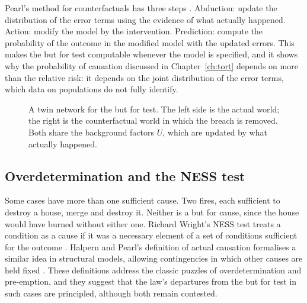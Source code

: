 Pearl's method for counterfactuals has three steps \citep{pearl2009}. Abduction: update the distribution of the error terms using the evidence of what actually happened. Action: modify the model by the intervention. Prediction: compute the probability of the outcome in the modified model with the updated errors. This makes the but for test computable whenever the model is specified, and it shows why the probability of causation discussed in Chapter~\ref{ch:tort} depends on more than the relative risk: it depends on the joint distribution of the error terms, which data on populations do not fully identify.

\begin{figure}[t]
\centering
{}
\caption{A twin network for the but for test. The left side is the actual world; the right is the counterfactual world in which the breach is removed. Both share the background factors $U$, which are updated by what actually happened.}
\label{fig:twin}
\end{figure}

\subsection{Overdetermination and the NESS test}

Some cases have more than one sufficient cause. Two fires, each sufficient to destroy a house, merge and destroy it. Neither is a but for cause, since the house would have burned without either one. Richard Wright's NESS test treats a condition as a cause if it was a necessary element of a set of conditions sufficient for the outcome \citep{wright1985}. Halpern and Pearl's definition of actual causation formalises a similar idea in structural models, allowing contingencies in which other causes are held fixed \citep{halpern2005}. These definitions address the classic puzzles of overdetermination and pre-emption, and they suggest that the law's departures from the but for test in such cases are principled, although both remain contested.


